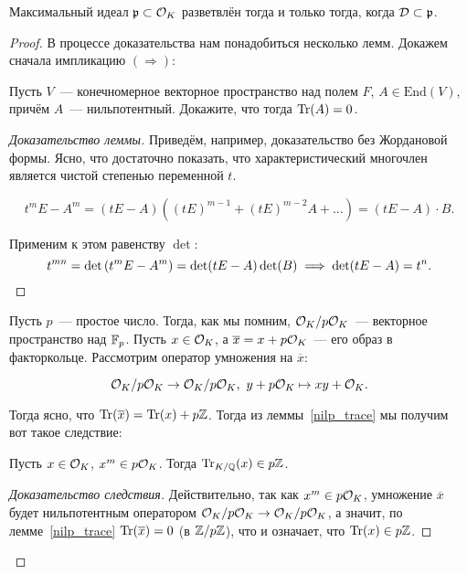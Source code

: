  	 \begin{theorem}\label{diff_ram} 
	 	Максимальный идеал $\mathfrak{p} \subset \mathcal{O}_{K}$ разветвлён тогда и только тогда, когда $\mathcal{D} \subset \mathfrak{p}$.
	 \end{theorem}
	 \begin{proof} В процессе доказательства нам понадобиться несколько лемм.  Докажем сначала импликацию $(\mathbf{\Rightarrow})$:

	 	\begin{lemma}\label{nilp_trace}
	 		Пусть $V$~--- конечномерное векторное пространство над полем $F$, $A \in \mathrm{End}(V)$, причём $A$~--- нильпотентный. Докажите, что тогда $\operatorname{Tr}(A) = 0$.
	 	\end{lemma}
	 	\begin{proof}[Доказательство леммы]
	 	Приведём, например, доказательство без Жордановой формы. Ясно, что достаточно показать, что характеристический многочлен является чистой степенью переменной $t$.

	 	\[
	 		t^m E - A^m = (tE - A)((tE)^{m - 1} + (tE)^{m - 2} A + \ldots) = (tE - A) \cdot B.
	 	\]

	 	Применим к этом равенству $\det$:
	 	\[ 
	 		t^{mn} = \det{\lr*{t^m E - A^m}} = \det\lr*{tE - A}\det\lr*{B} \implies \det\lr*{tE - A} = t^n. 
		\]
		\end{proof}

		Пусть $p$~--- простое число. Тогда, как мы помним,  $\mathcal{O}_{K}/p\mathcal{O}_{K}$~--- векторное пространство над $\mathbb{F}_{p}$. Пусть $x \in \mathcal{O}_{K}$, а $\overline{x} = x + p\mathcal{O}_{K}$~--- его образ в факторкольце. Рассмотрим оператор умножения на $\overline{x}$:

		\[
			\cO_{K}/p\cO_{K} \to \cO_{K}/p\cO_{K}, \ y + p\cO_{K} \mapsto xy + \cO_{K}.
		\]

		Тогда ясно, что $\operatorname{Tr}(\overline{x}) = \operatorname{Tr}(x) + p\mathbb{Z}$.  Тогда из леммы~\ref{nilp_trace} мы получим вот такое следствие:

		\begin{corollary}\label{TraceCor}
			Пусть $x \in \mathcal{O}_{K}$, $x^m \in p\mathcal{O}_{K}$. Тогда $\operatorname{Tr}_{K/\mathbb{Q}}(x) \in p\mathbb{Z}$. 
		\end{corollary}
		\begin{proof}[Доказательство следствия]
				Действительно, так как $x^m \in p\mathcal{O}_{K}$, умножение $\overline{x}$ будет нильпотентным оператором $\mathcal{O}_{K}/p\mathcal{O}_{K} \to \mathcal{O}_{K}/p\mathcal{O}_{K}$, а значит, по лемме~\ref{nilp_trace} $\operatorname{Tr}(\overline{x}) = 0$ (в $\mathbb{Z}/p\mathbb{Z}$),  что и означает, что $\operatorname{Tr}(x) \in p\mathbb{Z}$.
			\end{proof}	
	 	


\end{proof}
